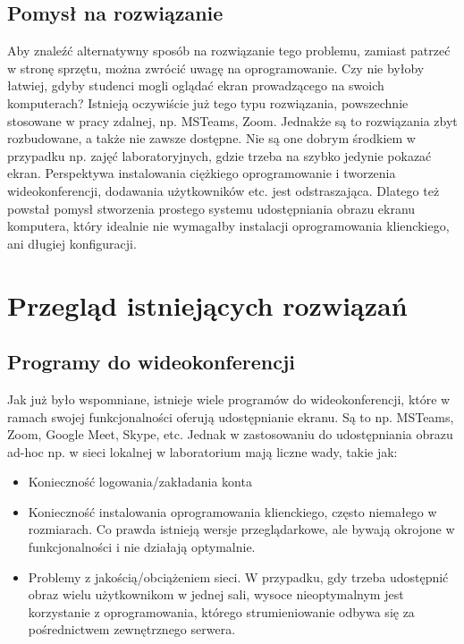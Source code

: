 \documentclass[a4paper,11pt]{article}
\begin{document}
        \subsection{Pomysł na rozwiązanie}
        Aby znaleźć alternatywny sposób na rozwiązanie tego problemu, zamiast patrzeć w stronę sprzętu, można zwrócić uwagę na oprogramowanie. Czy nie byłoby łatwiej, gdyby studenci mogli oglądać ekran prowadzącego na swoich komputerach?
        Istnieją oczywiście już tego typu rozwiązania, powszechnie stosowane w pracy zdalnej, np. MSTeams, Zoom. Jednakże są to rozwiązania zbyt rozbudowane, a także nie zawsze dostępne. Nie są one dobrym środkiem 
        w przypadku np. zajęć laboratoryjnych, gdzie trzeba na szybko jedynie pokazać ekran. Perspektywa instalowania ciężkiego oprogramowanie i tworzenia wideokonferencji, dodawania użytkowników etc. jest odstraszająca.
        Dlatego też powstał pomysł stworzenia prostego systemu udostępniania obrazu ekranu komputera, który idealnie nie wymagałby instalacji oprogramowania klienckiego, ani długiej konfiguracji. 
    \section{Przegląd istniejących rozwiązań}
        \subsection{Programy do wideokonferencji}
        Jak już było wspomniane, istnieje wiele programów do wideokonferencji, które w ramach swojej funkcjonalności oferują udostępnianie ekranu. Są to np. MSTeams, Zoom, Google Meet, Skype, etc.
        Jednak w zastosowaniu do udostępniania obrazu ad-hoc np. w sieci lokalnej w laboratorium mają liczne wady, takie jak:
        \begin{itemize}
            \item Konieczność logowania/zakładania konta
            \item Konieczność instalowania oprogramowania klienckiego, często niemałego w rozmiarach. Co prawda istnieją wersje przeglądarkowe, ale bywają okrojone w funkcjonalności i nie działają optymalnie. 
            \item Problemy z jakością/obciążeniem sieci. W przypadku, gdy trzeba udostępnić obraz wielu użytkownikom w jednej sali, wysoce nieoptymalnym jest korzystanie z oprogramowania, którego strumieniowanie
            odbywa się za pośrednictwem zewnętrznego serwera.   
        \end{itemize}     
\end{document}

